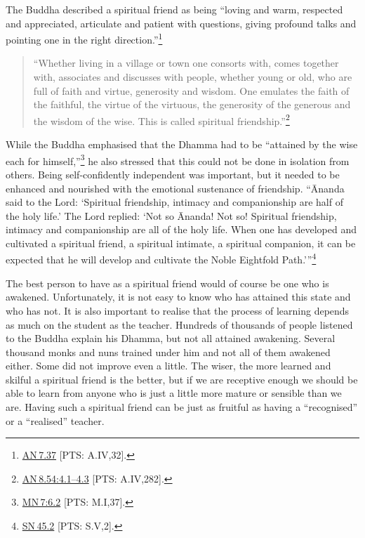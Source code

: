 \documentclass[10pt, openright]{book}
\begin{document}
The Buddha described a spiritual friend as being “loving and warm, respected and appreciated, articulate and patient with questions, giving profound talks and pointing one in the right direction.”\footnote {\href{https://suttacentral.net/an7.37/en/sujato}{AN 7.37} [PTS: A.IV,32].}


\begin{quote}

\hspace{-0.4em}“Whether living in a village or town one consorts with, comes together with, associates and discusses with people, whether young or old, who are full of faith and virtue, generosity and wisdom. One emulates the faith of the faithful, the virtue of the virtuous, the generosity of the generous and the wisdom of the wise. This is called spiritual friendship.”\footnote {\href{https://suttacentral.net/an8.54/en/sujato\#4.1}{AN 8.54:4.1–4.3} [PTS: A.IV,282].}


\end{quote}
While the Buddha emphasised that the Dhamma had to be “attained by the wise each for himself,”\footnote {\href{https://suttacentral.net/mn7/en/sujato\#6.2}{MN 7:6.2} [PTS: M.I,37].} he also stressed that this could not be done in isolation from others. Being self-confidently independent was important, but it needed to be enhanced and nourished with the emotional sustenance of friendship. “Ānanda said to the Lord: ‘Spiritual friendship, intimacy and companionship are half of the holy life.’ The Lord replied: ‘Not so Ānanda! Not so! Spiritual friendship, intimacy and companionship are all of the holy life. When one has developed and cultivated a spiritual friend, a spiritual intimate, a spiritual companion, it can be expected that he will develop and cultivate the Noble Eightfold Path.’”\footnote {\href{https://suttacentral.net/sn45.2/en/sujato}{SN 45.2} [PTS: S.V,2].}


The best person to have as a spiritual friend would of course be one who is awakened. Unfortunately, it is not easy to know who has attained this state and who has not. It is also important to realise that the process of learning depends as much on the student as the teacher. Hundreds of thousands of people listened to the Buddha explain his Dhamma, but not all attained awakening. Several thousand monks and nuns trained under him and not all of them awakened either. Some did not improve even a little. The wiser, the more learned and skilful a spiritual friend is the better, but if we are receptive enough we should be able to learn from anyone who is just a little more mature or sensible than we are. Having such a spiritual friend can be just as fruitful as having a “recognised” or a “realised” teacher.
\end{document}
